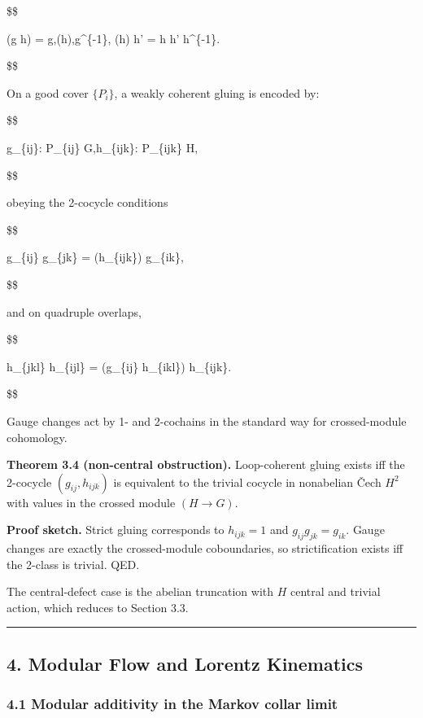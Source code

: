 \documentclass[11pt,a4paper]{article}
\theoremstyle{remark}
\begin{document}
\$\$

\partial(g \triangleright h) = g,\partial(h),g\^{}\{-1\},
\qquad
\partial(h) \triangleright h' = h h' h\^{}\{-1\}.

\$\$

On a good cover \(\{P_i\}\), a weakly coherent gluing is encoded by:

\$\$

g\_\{ij\}: P\_\{ij\} \to G,\qquad h\_\{ijk\}: P\_\{ijk\} \to H,

\$\$

obeying the 2-cocycle conditions

\$\$

g\_\{ij\} g\_\{jk\} = \partial(h\_\{ijk\}) g\_\{ik\},

\$\$

and on quadruple overlaps,

\$\$

h\_\{jkl\} h\_\{ijl\} = (g\_\{ij\} \triangleright h\_\{ikl\}) h\_\{ijk\}.

\$\$

Gauge changes act by 1- and 2-cochains in the standard way for crossed-module
cohomology.

\textbf{Theorem 3.4 (non-central obstruction).} Loop-coherent gluing exists iff
the 2-cocycle \((g_{ij}, h_{ijk})\) is equivalent to the trivial cocycle in
nonabelian Čech \(H^2\) with values in the crossed module \((H \to G)\).

\textbf{Proof sketch.} Strict gluing corresponds to \(h_{ijk}=1\) and \(g_{ij}g_{jk}=g_{ik}\).
Gauge changes are exactly the crossed-module coboundaries, so strictification
exists iff the 2-class is trivial. QED.

The central-defect case is the abelian truncation with \(H\) central and trivial
action, which reduces to Section 3.3.

\begin{center}\rule{0.5\linewidth}{0.5pt}\end{center}

\subsection{4. Modular Flow and Lorentz Kinematics}\label{modular-flow-and-lorentz-kinematics}

\subsubsection{4.1 Modular additivity in the Markov collar limit}\label{modular-additivity-in-the-markov-collar-limit}
\end{document}
